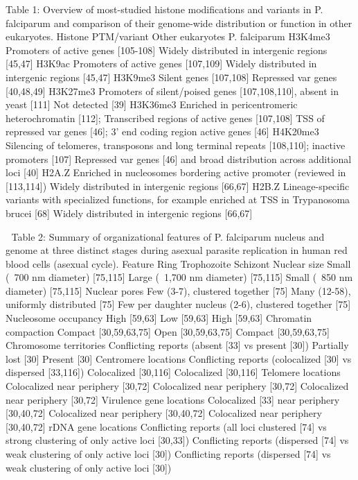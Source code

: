 Table 1: Overview of most-studied histone modifications and variants in P.
falciparum and comparison of their genome-wide distribution or function in
other eukaryotes.
Histone PTM/variant
Other eukaryotes
P. falciparum
H3K4me3
Promoters of active genes [105-108]
Widely distributed in intergenic regions [45,47]
H3K9ac
Promoters of active genes [107,109]
Widely distributed in intergenic regions
[45,47]
H3K9me3
Silent genes [107,108]
Repressed var genes [40,48,49]
H3K27me3
Promoters of silent/poised genes [107,108,110], absent in yeast [111]
Not detected [39]
H3K36me3
Enriched in pericentromeric heterochromatin [112];
Transcribed regions of active genes [107,108]
TSS of repressed var genes [46];
3’ end coding region active genes [46]
H4K20me3
Silencing of telomeres, transposons and long terminal repeats [108,110];
inactive promoters [107]
Repressed var genes [46] and broad distribution across additional loci [40]
H2A.Z
Enriched in nucleosomes bordering active promoter (reviewed in [113,114])
Widely distributed in intergenic regions [66,67]
H2B.Z
Lineage-specific variants with specialized functions, for example enriched at
TSS in Trypanosoma brucei [68]
Widely distributed in intergenic regions [66,67]


Table 2: Summary of organizational features of P. falciparum nucleus and
genome at three distinct stages during asexual parasite replication in human
red blood cells (asexual cycle).
Feature
Ring
Trophozoite
Schizont
Nuclear size
Small (~700 nm diameter) [75,115]
Large (~1,700 nm diameter) [75,115]
Small (~850 nm diameter) [75,115]
Nuclear pores
Few (3-7), clustered together [75]
Many (12-58), uniformly distributed [75]
Few per daughter nucleus (2-6), clustered together [75]
Nucleosome occupancy
High [59,63]
Low [59,63]
High [59,63]
Chromatin compaction
Compact [30,59,63,75]
Open [30,59,63,75]
Compact [30,59,63,75]
Chromosome territories
Conflicting reports (absent [33] vs present [30])
Partially lost [30]
Present [30]
Centromere locations
Conflicting reports (colocalized [30] vs dispersed [33,116])
Colocalized [30,116]
Colocalized [30,116]
Telomere locations
Colocalized near periphery [30,72]
Colocalized near periphery [30,72]
Colocalized near periphery [30,72]
Virulence gene locations
Colocalized [33] near periphery [30,40,72]
Colocalized near periphery [30,40,72]
Colocalized near periphery [30,40,72]
rDNA gene locations
Conflicting reports (all loci clustered [74] vs strong clustering of only
active loci [30,33])
Conflicting reports (dispersed [74] vs weak clustering of only active loci
[30])
Conflicting reports (dispersed [74] vs weak clustering of only active loci
[30])

